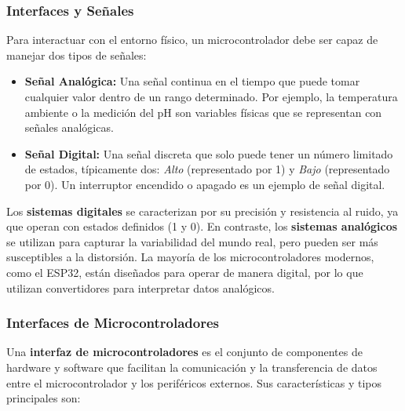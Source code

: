 \documentclass[a4paper,12pt]{article}
\begin{document}
	\subsubsection{Interfaces y Señales}
	Para interactuar con el entorno físico, un microcontrolador debe ser capaz de manejar dos tipos de señales:
	
	\begin{itemize}
		\item \textbf{Señal Analógica:} Una señal continua en el tiempo que puede tomar cualquier valor dentro de un rango determinado. Por ejemplo, la temperatura ambiente o la medición del pH son variables físicas que se representan con señales analógicas.
		\item \textbf{Señal Digital:} Una señal discreta que solo puede tener un número limitado de estados, típicamente dos: \textit{Alto} (representado por 1) y \textit{Bajo} (representado por 0). Un interruptor encendido o apagado es un ejemplo de señal digital.
	\end{itemize}
	
	Los \textbf{sistemas digitales} se caracterizan por su precisión y resistencia al ruido, ya que operan con estados definidos (1 y 0). En contraste, los \textbf{sistemas analógicos} se utilizan para capturar la variabilidad del mundo real, pero pueden ser más susceptibles a la distorsión. La mayoría de los microcontroladores modernos, como el ESP32, están diseñados para operar de manera digital, por lo que utilizan convertidores para interpretar datos analógicos.
	
	\subsubsection{Interfaces de Microcontroladores}
	Una \textbf{interfaz de microcontroladores} es el conjunto de componentes de hardware y software que facilitan la comunicación y la transferencia de datos entre el microcontrolador y los periféricos externos. Sus características y tipos principales son:
	
\end{document}
